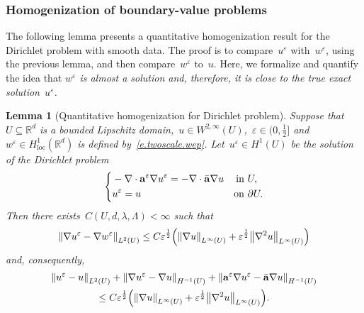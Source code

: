 \documentclass[11pt,twoside]{article} %
\numberwithin{equation}{section}
\newtheorem{lemma}[theorem]{Lemma}
\theoremstyle{definition}
\let\originalleft\left
\let\originalright\right
\renewcommand{\left}{\mathopen{}\mathclose\bgroup\originalleft}
\renewcommand{\right}{\aftergroup\egroup\originalright}
\newcommand*{\Rd}{\ensuremath{\mathbb{R}^d}}
\newcommand{\eps}{\varepsilon}
\newcommand{\ep}{\eps}
\renewcommand{\a}{\mathbf{a}}
\newcommand{\ahom}{\bar{\a}}
\begin{document}
\subsubsection{Homogenization of boundary-value problems}



The following lemma presents a quantitative homogenization result for the Dirichlet problem with smooth data. The proof is to compare~$u^\ep$ with~$w^\ep$, using the previous lemma, and then compare~$w^\ep$ to~$u$.  Here, we formalize and quantify the idea that \emph{$w^\ep$ is almost a solution and, therefore, it is close to the true exact solution~$u^\ep$.} 


\begin{lemma}[Quantitative homogenization for Dirichlet problem]
\label{l.DP.2infty}
Suppose that~$U\subseteq\Rd$ is a bounded Lipschitz domain,~$u\in W^{2,\infty}(U)$,~$\ep\in (0,\tfrac12]$ and~$w^\ep\in H^1_{\mathrm{loc}}(\Rd)$ is defined by~\eqref{e.twoscale.wep}. Let~$u^\ep \in H^1(U)$ be the solution of the Dirichlet problem 
\begin{align}
\label{e.eq.DP.2infty}
\left\{
\begin{aligned}
& -\nabla \cdot \a^\ep \nabla u^\ep = - \nabla \cdot \ahom\nabla u & \mbox{in} & \ U, 
\\
& u^\ep = u & \mbox{on} & \ \partial U. 
\end{aligned}
\right.
\end{align}
Then there exists~$C(U,d,\lambda,\Lambda)<\infty$ such that 
\begin{equation}
\label{e.ee.easy}
\left\| \nabla u^\ep - \nabla w^\ep \right\|_{{L}^2(U)} 
\leq
C \ep^{\frac12} \left(  \left\| \nabla u \right\|_{L^\infty(U)}
+
\ep^{\frac12} \left\| \nabla^2 u \right\|_{L^\infty(U)}
\right)
\end{equation}
and, consequently, 
\begin{multline}
\label{e.ee.easy2}
\left\| 
u^\ep - u 
\right\|_{L^2(U)} 
+
\left\| 
\nabla u^\ep - \nabla u \right\|_{H^{-1}(U)} 
+
\left\| 
\a^\ep \nabla u^\ep - \ahom \nabla u \right\|_{H^{-1}(U)}
\\
\leq 
C \ep^{\frac12} \left(  \left\| \nabla u \right\|_{L^\infty(U)}
+
\ep^{\frac12} \left\| \nabla^2 u \right\|_{L^\infty(U)}
\right).
\end{multline}
\end{lemma}
\end{document}
